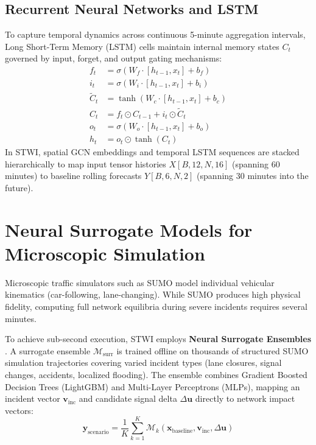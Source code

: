 \subsection{Recurrent Neural Networks and LSTM}
To capture temporal dynamics across continuous 5-minute aggregation intervals, Long Short-Term Memory (LSTM) cells \cite{hochreiter1997lstm} maintain internal memory states $C_t$ governed by input, forget, and output gating mechanisms:
\begin{align}
  f_t &= \sigma(W_f \cdot [h_{t-1}, x_t] + b_f) \\
  i_t &= \sigma(W_i \cdot [h_{t-1}, x_t] + b_i) \\
  \tilde{C}_t &= \tanh(W_c \cdot [h_{t-1}, x_t] + b_c) \\
  C_t &= f_t \odot C_{t-1} + i_t \odot \tilde{C}_t \\
  o_t &= \sigma(W_o \cdot [h_{t-1}, x_t] + b_o) \\
  h_t &= o_t \odot \tanh(C_t)
\end{align}
In STWI, spatial GCN embeddings and temporal LSTM sequences are stacked hierarchically to map input tensor histories $X[B, 12, N, 16]$ (spanning 60 minutes) to baseline rolling forecasts $Y[B, 6, N, 2]$ (spanning 30 minutes into the future).

\section{Neural Surrogate Models for Microscopic Simulation}
Microscopic traffic simulators such as SUMO \cite{krajzewicz2012sumo} model individual vehicular kinematics (car-following, lane-changing). While SUMO produces high physical fidelity, computing full network equilibria during severe incidents requires several minutes.

To achieve sub-second execution, STWI employs \textbf{Neural Surrogate Ensembles} \cite{wen2023surrogate}. A surrogate ensemble $\mathcal{M}_{\text{surr}}$ is trained offline on thousands of structured SUMO simulation trajectories covering varied incident types (lane closures, signal changes, accidents, localized flooding). The ensemble combines Gradient Boosted Decision Trees (LightGBM) and Multi-Layer Perceptrons (MLPs), mapping an incident vector $\mathbf{v}_{\text{inc}}$ and candidate signal delta $\Delta \mathbf{u}$ directly to network impact vectors:
\begin{equation}
  \hat{\mathbf{y}}_{\text{scenario}} = \frac{1}{K} \sum_{k=1}^K \mathcal{M}_k(\mathbf{x}_{\text{baseline}}, \mathbf{v}_{\text{inc}}, \Delta \mathbf{u})
\end{equation}

